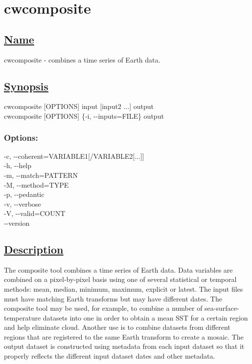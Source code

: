 \newpage
\section{cwcomposite} \hypertarget{cwcomposite}{}
\subsection*{\underline{Name}}


   cwcomposite - combines a time series of Earth data.  
\subsection*{\underline{Synopsis}}


  cwcomposite [OPTIONS] input [input2 ...] output\\ 
 cwcomposite [OPTIONS] \{-i, -{-}inputs=FILE\} output 
\subsubsection*{Options:}


  -c, -{-}coherent=VARIABLE1[/VARIABLE2[...{]}] \\ 
 -h, -{-}help \\ 
 -m, -{-}match=PATTERN \\ 
 -M, -{-}method=TYPE \\ 
 -p, -{-}pedantic \\ 
 -v, -{-}verbose \\ 
 -V, -{-}valid=COUNT \\ 
 -{-}version \\ 

\subsection*{\underline{Description}}


  The composite tool combines a time series of Earth data. Data variables are combined on a pixel-by-pixel basis using one of several statistical or temporal methods: mean, median, minimum, maximum, explicit or latest. The input files must have matching Earth transforms but may have different dates. The composite tool may be used, for example, to combine a number of sea-surface-temperature datasets into one in order to obtain a mean SST for a certain region and help eliminate cloud. Another use is to combine datasets from different regions that are registered to the same Earth transform to create a mosaic. The output dataset is constructed using metadata from each input dataset so that it properly reflects the different input dataset dates and other metadata. 
